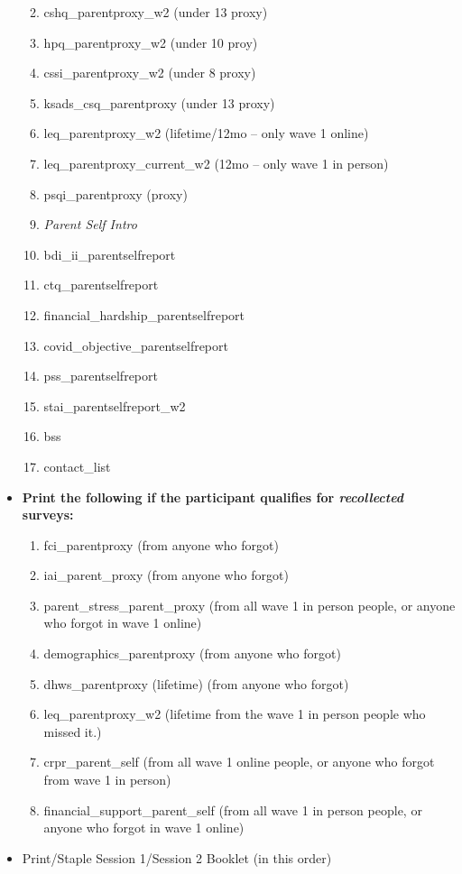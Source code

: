 \documentclass[]{book}
\providecommand{\tightlist}{%
  \setlength{\itemsep}{0pt}\setlength{\parskip}{0pt}}
\begin{document}
\begin{itemize}
  \begin{enumerate}
  \def\labelenumi{\arabic{enumi}.}
  \setcounter{enumi}{16}
  \tightlist
  \item
    cshq\_parentproxy\_w2 (under 13 proxy)
  \item
    hpq\_parentproxy\_w2 (under 10 proy)
  \item
    cssi\_parentproxy\_w2 (under 8 proxy)
  \item
    ksads\_csq\_parentproxy (under 13 proxy)
  \item
    leq\_parentproxy\_w2 (lifetime/12mo -- only wave 1 online)
  \item
    leq\_parentproxy\_current\_w2 (12mo -- only wave 1 in person)
  \item
    psqi\_parentproxy (proxy)
  \item
    \emph{Parent Self Intro}
  \item
    bdi\_ii\_parentselfreport
  \item
    ctq\_parentselfreport
  \item
    financial\_hardship\_parentselfreport
  \item
    covid\_objective\_parentselfreport
  \item
    pss\_parentselfreport
  \item
    stai\_parentselfreport\_w2
  \item
    bss
  \item
    contact\_list
  \end{enumerate}
\item
  \textbf{Print the following if the participant qualifies for \emph{recollected} surveys:}

  \begin{enumerate}
  \def\labelenumi{\arabic{enumi}.}
  \setcounter{enumi}{31}
  \tightlist
  \item
    fci\_parentproxy (from anyone who forgot)
  \item
    iai\_parent\_proxy (from anyone who forgot)
  \item
    parent\_stress\_parent\_proxy (from all wave 1 in person people, or anyone who forgot in wave 1 online)\\
  \item
    demographics\_parentproxy (from anyone who forgot)
  \item
    dhws\_parentproxy (lifetime) (from anyone who forgot)
  \item
    leq\_parentproxy\_w2 (lifetime from the wave 1 in person people who missed it.)
  \item
    crpr\_parent\_self (from all wave 1 online people, or anyone who forgot from wave 1 in person)\\
  \item
    financial\_support\_parent\_self (from all wave 1 in person people, or anyone who forgot in wave 1 online)
  \end{enumerate}
\item
  Print/Staple Session 1/Session 2 Booklet (in this order)


\end{itemize}
\end{document}
